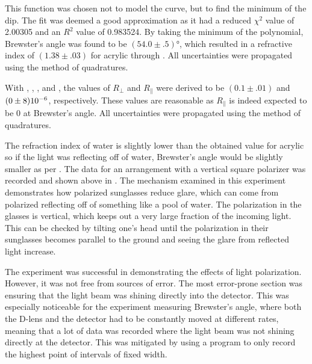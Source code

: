 \begin{paper}
	
	This function was chosen not to model the curve, but to find the minimum of the dip. The fit was deemed a good approximation as it had a reduced $\chi^2$ value of 2.00305 and an $R^2$ value of 0.983524. By taking the minimum of the polynomial, Brewster's angle was found to be $(54.0\pm.5)\si{\degree}$, which resulted in a refractive index of $(1.38\pm.03)$ for acrylic through \eqPolarizingAngle. All uncertainties were propagated using the method of quadratures.
	
	With \eqReflectionPerp, \eqReflectionParallel, \eqReflectancePerp, and \eqReflectanceParallel, the values of $R_{\perp}$ and $R_{\parallel}$ were derived to be $(0.1\pm.01)$ and $(0\pm8)\SI{E-6}{}$, respectively. These values are reasonable as $R_{\parallel}$ is indeed expected to be 0 at Brewster's angle. All uncertainties were propagated using the method of quadratures.
	
	The refraction index of water is slightly lower than the obtained value for acrylic so if the light was reflecting off of water, Brewster's angle would be slightly smaller as per \eqPolarizingAngle. The data for an arrangement with a vertical square polarizer was recorded and shown above in \figVertical. The mechanism examined in this experiment demonstrates how polarized sunglasses reduce glare, which can come from polarized reflecting off of something like a pool of water. The polarization in the glasses is vertical, which keeps out a very large fraction of the incoming light. This can be checked by tilting one's head until the polarization in their sunglasses becomes parallel to the ground and seeing the glare from reflected light increase.
	

	The experiment was successful in demonstrating the effects of light polarization. However, it was not free from sources of error. The most error-prone section was ensuring that the light beam was shining directly into the detector. This was especially noticeable for the experiment measuring Brewster's angle, where both the D-lens and the detector had to be constantly moved at different rates, meaning that a lot of data was recorded where the light beam was not shining directly at the detector. This was mitigated by using a program to only record the highest point of intervals of fixed width.
	

\end{paper}
